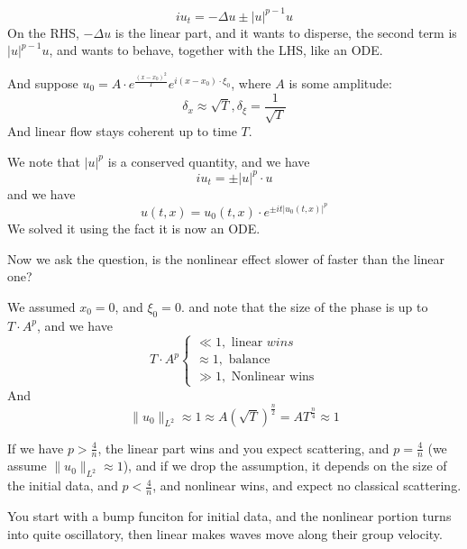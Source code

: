 \begin{equation*}
    iu_t=-\Delta u\pm|u|^{p-1}u
\end{equation*}
On the RHS, $-\Delta u$ is the linear part, and it wants to disperse, the second term is $|u|^{p-1}u$, and wants to behave, together with the LHS, like an ODE.

And suppose $u_0=A\cdot e^\frac{(x-x_0)^2}{T}e^{i(x-x_0)\cdot\xi_0}$, where $A$ is some amplitude:
\begin{equation*}
    \delta_x\approx\sqrt{T}, \delta_\xi=\frac{1}{\sqrt{T}}
\end{equation*}
And linear flow stays coherent up to time $T$.

We note that $|u|^p$ is a conserved quantity, and we have
\begin{equation*}
    iu_t=\pm|u|^p\cdot u
\end{equation*}
and we have
\begin{equation*}
    u(t,x)=u_0(t,x)\cdot e^{\pm it|u_0(t,x)|^p}
\end{equation*}
We solved it using the fact it is now an ODE.

Now we ask the question, is the nonlinear effect slower of faster than the linear one?

We assumed $x_0=0$, and $\xi_0=0$. and note that the size of the phase is up to $T\cdot A^p$, and we have
\begin{equation*}
    T\cdot A^p\begin{cases}
        \ll 1, \text{ linear } wins\\
        \approx 1, \text{ balance }\\
        \gg 1, \text{ Nonlinear wins}
    \end{cases}
\end{equation*}
And 
\begin{equation*}
    \|u_0\|_{L^2}\approx 1\approx A(\sqrt{T})^\frac{n}{2}=AT^\frac{n}{4}\approx 1
\end{equation*}

If we have $p>\frac{4}{n}$, the linear part wins and you expect scattering, and $p=\frac{4}{n}$ (we assume $\|u_0\|_{L^2}\approx 1$), and if we drop the assumption, it depends on the size of the initial data, and $p<\frac{4}{n}$, and nonlinear wins, and expect no classical scattering.

You start with a bump funciton for initial data, and the nonlinear portion turns into quite oscillatory, then linear makes waves move along their group velocity. 


